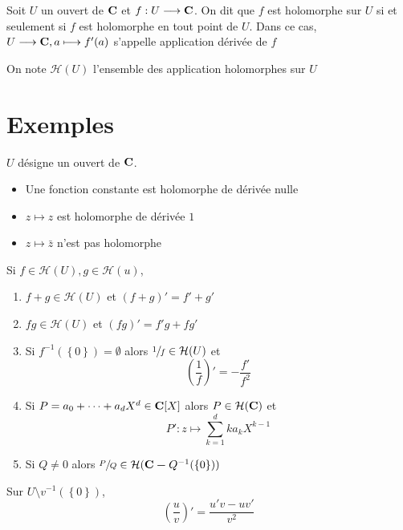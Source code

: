 \begin{dfn}
    Soit $U$ un ouvert de  $\mathbf C$ et $f:U\longrightarrow \mathbf C$. On dit que $f$ est holomorphe sur  $U$  si et seulement si $f$ est holomorphe en tout point de  $U$. Dans ce cas, $U\longrightarrow \mathbf C, a\longmapsto f'(a)$ s'appelle application dérivée de $f$ 

    On note $\mathcal  H(U)$ l'ensemble des application holomorphes sur $U$
\end{dfn}

\section{Exemples}

$U$ désigne un ouvert de $\mathbf C$.

\begin{itemize}
    \item Une fonction constante est holomorphe de dérivée nulle
    \item $z\longmapsto z$ est holomorphe de dérivée $1$
    \item  $z\longmapsto \bar z$ n'est pas holomorphe
\end{itemize}

\begin{prop}
    Si $f \in  \mathcal  H(U), g \in \mathcal  H(u)$, \begin{enumerate}[label=(\alph*)]
        \item $f+g \in  \mathcal H(U)$ et $(f+g)'=f'+g'$
        \item  $fg \in  \mathcal H(U)$ et $(fg)'=f'g+fg'$
        \item  Si $f^{-1}( \left\{  0 \right\}  )=\emptyset$ alors $\sfrac1f \in  \mathcal  H(U)$ et \[
         \left( \frac{1}{f} \right)'=-\frac{f'}{f^2 }
        \] 
    \item Si  $P=a_0+\cdots +a_dX^d \in  \mathbf C[X]$ alors $P \in  \mathcal  H(\mathbf C)$ et \[
            P':z\longmapsto  \sum_{k=1}^{d} ka_kX^{k-1}
    \]
    \item Si $Q \neq 0$ alors $\sfrac PQ \in  \mathcal  H(\mathbf C \bm- Q^{-1}(\left\{ 0 \right\} ) )$
    \end{enumerate}
\end{prop}

\begin{rem}
    Sur $U \setminus  v^{-1}(\left\{ 0 \right\} )$,
\[
    \left( \frac{u}{v} \right)'=\frac{u'v-uv'}{v^2 }
\] 
\end{rem}

